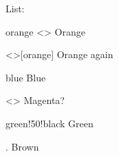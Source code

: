 \documentclass[a4paper, 11pt]{article}
\begin{document}
\begin{tcblisting}{}

    \begingroup
    \color{brown}
    List:
    \begin{boxedlist}
        \item[orange]<\ttfamily> Orange  %
        \item<\ttfamily>[orange] Orange again %
        \item[blue] Blue  %
        \item<> Magenta?  %
        \item[green!50!black] Green  %
        \item[.] Brown  %
    \end{boxedlist}
    \endgroup
\end{tcblisting}


\printindex
\end{document}
